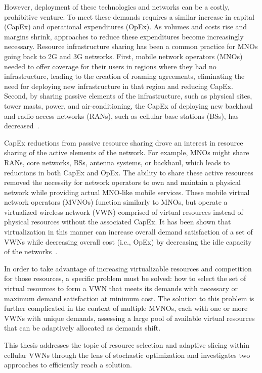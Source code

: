 \documentclass[12pt,dvipsnames]{report}
\begin{document}
However, deployment of these technologies and networks can be a costly, prohibitive venture.  To meet these demands requires a similar increase in capital (CapEx) and operational expenditures (OpEx).  As volumes and costs rise and margins shrink, approaches to reduce these expenditures become increasingly necessary.  Resource infrastructure sharing has been a common practice for MNOs going back to 2G and 3G networks.  First, mobile network operators (MNOs) needed to offer coverage for their users in regions where they had no infrastructure, leading to the creation of roaming agreements, eliminating the need for deploying new infrastructure in that region and reducing CapEx.  Second, by sharing passive elements of the infrastructure, such as physical sites, tower masts, power, and air-conditioning, the CapEx of deploying new backhaul and radio access networks (RANs), such as cellular base stations (BSs), has decreased~\cite{1421931}.

CapEx reductions from passive resource sharing drove an interest in resource sharing of the active elements of the network.  For example, MNOs might share RANs, core networks, BSs, antenna systems, or backhaul, which leads to reductions in both CapEx and OpEx.  The ability to share these active resources removed the necessity for network operators to own and maintain a physical network while providing actual MNO-like mobile services.  These mobile virtual network operators (MVNOs) function similarly to MNOs, but operate a virtualized wireless network (VWN) comprised of virtual resources instead of physical resources without the associated CapEx.  It has been shown that virtualization in this manner can increase overall demand satisfaction of a set of VWNs while decreasing overall cost (i.e., OpEx) by decreasing the idle capacity of the networks~\cite{MJ_CCNC_16}.

In order to take advantage of increasing virtualizable resources and competition for those resources, a specific problem must be solved: how to select the set of virtual resources to form a VWN that meets its demands with necessary or maximum demand satisfaction at minimum cost.  The solution to this problem is further complicated in the context of multiple MVNOs, each with one or more VWNs with unique demands, assessing a large pool of available virtual resources that can be adaptively allocated as demands shift.

This thesis addresses the topic of resource selection and adaptive slicing within cellular VWNs through the lens of stochastic optimization and investigates two approaches to efficiently reach a solution.
\end{document}
